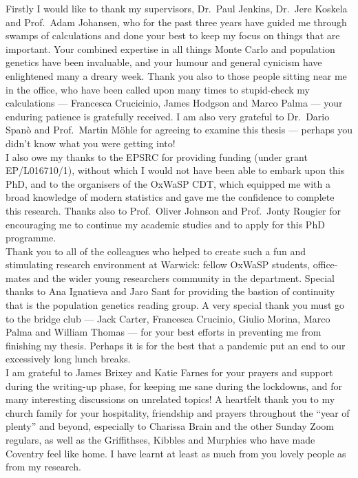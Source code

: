 \documentclass[oneside]{scrbook} %
\theoremstyle{definition}
\newcommand{\1}[1]{\mathbbm{1}_{#1}} %
\begin{document}
{\parindent0pt
Firstly I would like to thank my supervisors, Dr.\ Paul Jenkins, Dr.\ Jere Koskela and Prof.\ Adam Johansen, who for the past three years have guided me through swamps of calculations and done your best to keep my focus on things that are important.
Your combined expertise in all things Monte Carlo and population genetics have been invaluable, and your humour and general cynicism have enlightened many a dreary week.
Thank you also to those people sitting near me in the office, who have been called upon many times to stupid-check my calculations --- Francesca Crucicinio, James Hodgson and Marco Palma --- your enduring patience is gratefully received.
I am also very grateful to Dr.\ Dario Span\`o and Prof.\ Martin M\"ohle for agreeing to examine this thesis --- perhaps you didn't know what you were getting into!
\\

I also owe my thanks to the EPSRC for providing funding (under grant EP/L016710/1), without which I would not have been able to embark upon this PhD, and to the organisers of the OxWaSP CDT, which equipped me with a broad knowledge of modern statistics and gave me the confidence to complete this research.
Thanks also to Prof.\ Oliver Johnson and Prof.\ Jonty Rougier for encouraging me to continue my academic studies and to apply for this PhD programme.
\\

Thank you to all of the colleagues who helped to create such a fun and stimulating research environment at Warwick: fellow OxWaSP students, office-mates and the wider young researchers community in the department. Special thanks to Ana Ignatieva and Jaro Sant for providing the bastion of continuity that is the population genetics reading group.
A very special thank you must go to the bridge club --- Jack Carter, Francesca Crucinio, Giulio Morina, Marco Palma and William Thomas --- for your best efforts in preventing me from finishing my thesis. Perhaps it is for the best that a pandemic put an end to our excessively long lunch breaks.
\\

I am grateful to James Brixey and Katie Farnes for your prayers and support during the writing-up phase, for keeping me sane during the lockdowns, and for many interesting discussions on unrelated topics!
A heartfelt thank you to my church family for your hospitality, friendship and prayers throughout the ``year of plenty'' and beyond, especially to Charissa Brain and the other Sunday Zoom regulars, as well as the Griffithses, Kibbles and Murphies who have made Coventry feel like home. I have learnt at least as much from you lovely people as from my research.
\\

}
\end{document}
